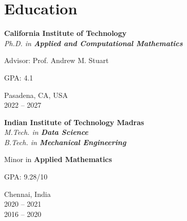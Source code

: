 \section{\sc Education}
\begin{minipage}[t]{0.75\textwidth}
\textbf{California Institute of Technology}\\
\emph{Ph.D. in \textbf{Applied and Computational Mathematics}}
\begin{list1}
    \item Advisor: Prof. Andrew M. Stuart
    \item GPA: 4.1
\end{list1}
\end{minipage}
\hfill
\begin{minipage}[t]{0.25\textwidth}
\begin{flushright}
    Pasadena, CA, USA\\
2022 -- 2027
\end{flushright}
\end{minipage}


\begin{minipage}[t]{0.75\textwidth}
\textbf{Indian Institute of Technology Madras}\\
\emph{M.Tech. in \textbf{Data Science}}\\
\emph{B.Tech. in \textbf{Mechanical Engineering}}
\begin{list1}
    \item Minor in \textbf{Applied Mathematics}
    \item GPA: 9.28/10
\end{list1}
\end{minipage}
\hfill
\begin{minipage}[t]{0.25\textwidth}
\begin{flushright}
    Chennai, India\\
2020 -- 2021\\
2016 -- 2020
\end{flushright}
\end{minipage}

\endinput